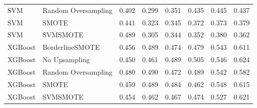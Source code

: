 \begin{tabular}{llllllll}
                         SVM & Random Oversampling & 0.402 &                     0.299 &                 0.351 &                  0.435 &                                   0.445 &     0.437 \\
                         SVM &               SMOTE & 0.441 &                     0.323 &                 0.345 &                  0.372 &                                   0.373 &     0.379 \\
                         SVM &            SVMSMOTE & 0.489 &                     0.305 &                 0.344 &                  0.352 &                                   0.380 &     0.362 \\
                     XGBoost &     BorderlineSMOTE & 0.456 &                     0.489 &                 0.474 &                  0.479 &                                   0.543 &     0.611 \\
                     XGBoost &       No Upsampling & 0.450 &                     0.461 &                 0.489 &                  0.505 &                                   0.546 &     0.624 \\
                     XGBoost & Random Oversampling & 0.480 &                     0.490 &                 0.472 &                  0.489 &                                   0.542 &     0.582 \\
                     XGBoost &               SMOTE & 0.459 &                     0.489 &                 0.484 &                  0.462 &                                   0.548 &     0.615 \\
                     XGBoost &            SVMSMOTE & 0.454 &                     0.462 &                 0.467 &                  0.474 &                                   0.527 &     0.621 \\
\bottomrule
\end{tabular}
